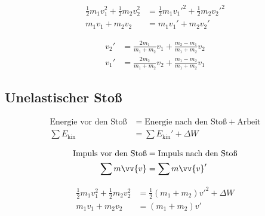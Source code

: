 \begin{boxleft}
\end{boxleft}\begin{boxrightshaded}
\begin{align}
\frac{1}{2}m_1v_1^2+\frac{1}{2}m_2v_2^2&=\frac{1}{2}m_1v_1'^2+\frac{1}{2}m_2v_2'^2\\
m_1v_1+m_2v_2&=m_1v_1'+m_2v_2'
\end{align}
\end{boxrightshaded}

\begin{boxleft}
\end{boxleft}\begin{boxrightshaded}
\begin{align}
v_2'&=\frac{2m_1}{m_1+m_2}v_1+\frac{m_2-m_1}{m_1+m_2}v_2\\
v_1'&=\frac{2m_2}{m_1+m_2}v_2+\frac{m_1-m_2}{m_1+m_2}v_1
\end{align}
\end{boxrightshaded}

\subsection{Unelastischer Stoß}

\begin{boxleft}
\end{boxleft}\begin{boxrightshaded}
\begin{align}
\text{Energie vor den Stoß} &= \text{Energie nach den Stoß}+\text{Arbeit}\nonumber\\
\sum E_{\text{kin}}&=\sum E_{\text{kin}}'+\Delta W
\end{align}
\end{boxrightshaded}

\begin{boxleft}
\end{boxleft}\begin{boxrightshaded}
\begin{align}
\text{Impuls vor den Stoß} &= \text{Impuls nach den Stoß}\nonumber\\
\sum m\vv{v}&= \sum m\vv{v}'
\end{align}
\end{boxrightshaded}

\begin{boxleft}
\end{boxleft}\begin{boxrightshaded}
\begin{align}
\frac{1}{2}m_1v_1^2+\frac{1}{2}m_2v_2^2&=\frac{1}{2}\left(m_1+m_2\right)v'^2+\Delta W\\
m_1v_1+m_2v_2&=\left(m_1+m_2\right)v'
\end{align}
\end{boxrightshaded}

